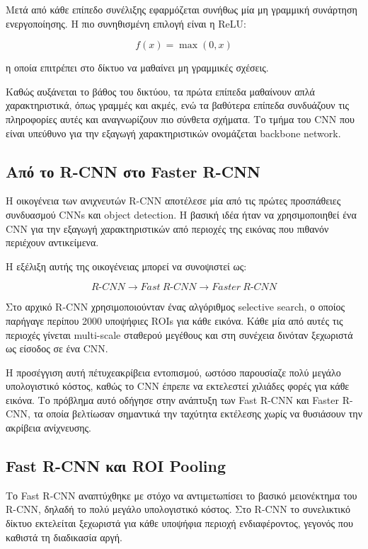 \documentclass[12pt]{article}
\begin{document}
Μετά από κάθε επίπεδο συνέλιξης εφαρμόζεται συνήθως μία μη γραμμική συνάρτηση ενεργοποίησης. Η πιο συνηθισμένη επιλογή είναι η ReLU:

\[
f(x)=\max(0,x)
\]

η οποία επιτρέπει στο δίκτυο να μαθαίνει μη γραμμικές σχέσεις.

Καθώς αυξάνεται το βάθος του δικτύου, τα πρώτα επίπεδα μαθαίνουν απλά χαρακτηριστικά, όπως γραμμές και ακμές, ενώ τα βαθύτερα επίπεδα συνδυάζουν 
τις πληροφορίες αυτές και αναγνωρίζουν πιο σύνθετα σχήματα. Το τμήμα του CNN που είναι υπεύθυνο για την εξαγωγή χαρακτηριστικών ονομάζεται 
backbone network.

\subsection{Από το R-CNN στο Faster R-CNN}

Η οικογένεια των ανιχνευτών R-CNN αποτέλεσε μία από τις πρώτες προσπάθειες συνδυασμού CNNs και object detection. Η βασική ιδέα ήταν να χρησιμοποιηθεί 
ένα CNN για την εξαγωγή χαρακτηριστικών από περιοχές της εικόνας που πιθανόν περιέχουν αντικείμενα.

Η εξέλιξη αυτής της οικογένειας μπορεί να συνοψιστεί ως:

\[
R\text{-}CNN
\rightarrow
Fast\ R\text{-}CNN
\rightarrow
Faster\ R\text{-}CNN
\]

Στο αρχικό R-CNN χρησιμοποιούνταν ένας αλγόριθμος selective search, ο οποίος παρήγαγε περίπου 2000 υποψήφιες ROIs για κάθε εικόνα. Κάθε μία από αυτές 
τις περιοχές γίνεται multi-scale σταθερού μεγέθους και στη συνέχεια δινόταν ξεχωριστά ως είσοδος σε ένα CNN.

Η προσέγγιση αυτή πέτυχεακρίβεια εντοπισμού, ωστόσο παρουσίαζε πολύ μεγάλο υπολογιστικό κόστος, καθώς το CNN έπρεπε να εκτελεστεί χιλιάδες φορές
για κάθε εικόνα. Το πρόβλημα αυτό οδήγησε στην ανάπτυξη των Fast R-CNN και Faster R-CNN, τα οποία βελτίωσαν σημαντικά την ταχύτητα εκτέλεσης 
χωρίς να θυσιάσουν την ακρίβεια ανίχνευσης.


\subsection{Fast R-CNN και ROI Pooling}

Το Fast R-CNN αναπτύχθηκε με στόχο να αντιμετωπίσει το βασικό μειονέκτημα του R-CNN, δηλαδή το πολύ μεγάλο υπολογιστικό κόστος. Στο R-CNN το 
συνελικτικό δίκτυο εκτελείται ξεχωριστά για κάθε υποψήφια περιοχή ενδιαφέροντος, γεγονός που καθιστά τη διαδικασία αργή.
\end{document}
